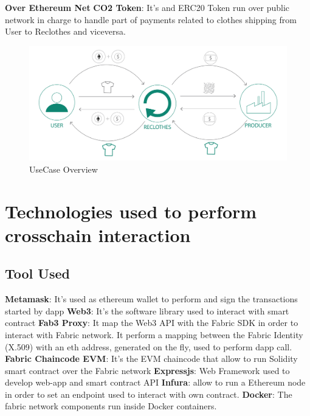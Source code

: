 {\begin{outline}[enumerate]
    \1 \textbf{Over Ethereum Net}
    \2 \textbf{CO2 Token}: It's and ERC20 Token run over public network in charge to handle part of payments
    related to clothes shipping from User to Reclothes and viceversa.
\end{outline}


\begin{figure}[h!]
	\centering
	\includegraphics[totalheight=6cm]{img/use-case-schema.png}
	\caption{UseCase Overview}
	\label{fig:schema}
\end{figure}


\section{Technologies used to perform crosschain interaction}

\subsection{Tool Used}

\begin{outline}
    \1 \textbf{Metamask}: It's used as ethereum wallet to perform and sign the transactions started by dapp 
    \1 \textbf{Web3}: It's the software library used to interact with smart contract
    \1 \textbf{Fab3 Proxy}: It map the Web3 API with the Fabric SDK in order to interact with
    Fabric network. It perform a mapping between the Fabric Identity (X.509) with an eth address, generated on the fly,
    used to perform dapp call. 
    \1 \textbf{Fabric Chaincode EVM}: It's the EVM chaincode that allow to run Solidity smart contract
    over the Fabric network
    \1 \textbf{Expressjs}: Web Framework used to develop web-app and smart contract API 
    \1 \textbf{Infura}: allow to run a Ethereum node in order to set an endpoint used to interact with own contract.
    \1 \textbf{Docker}: The fabric network components run inside Docker containers.
\end{outline}

}
